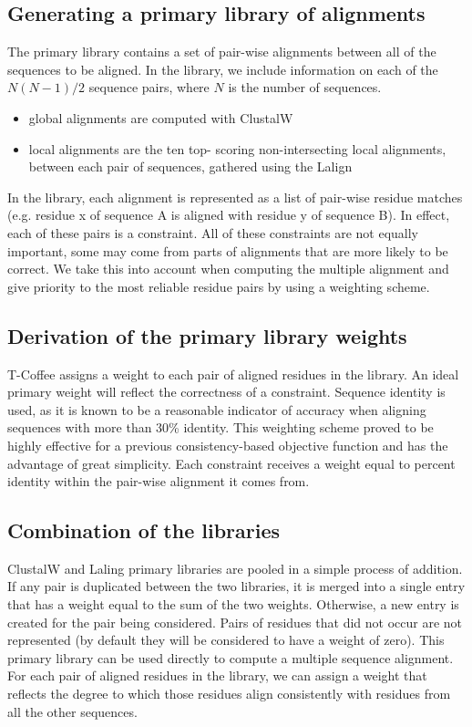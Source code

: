 \subsection{Generating a primary library of alignments}
The primary library contains a set of pair-wise alignments between all of the sequences to be aligned.
In the library, we include information on each of the $N(N - 1)/2$ sequence pairs, where $N$ is the number of sequences.
\begin{itemize}
\item global alignments are computed with ClustalW
\item  local alignments are the ten top- scoring non-intersecting local alignments, between each pair of sequences, gathered using the Lalign
\end{itemize}
In the library, each alignment is represented as a list of pair-wise residue matches (e.g. residue x of sequence A is aligned with residue y of sequence B). In effect, each of these pairs is a constraint. All of these constraints are not equally important, some may come from parts of alignments that are more likely to be correct. We take this into account when computing the multiple alignment and give priority to the most reliable residue pairs by using a weighting scheme.

\subsection{Derivation of the primary library weights}
T-Coffee assigns a weight to each pair of aligned residues in the library. An ideal primary weight will reflect the correctness of a constraint. Sequence identity is used, as it is known to be a reasonable indicator of accuracy when aligning sequences with more than 30\% identity. This weighting scheme proved to be highly effective for a previous consistency-based objective function and has the advantage of great simplicity.
Each constraint receives a weight equal to percent identity within the pair-wise alignment it comes from.

\subsection{Combination of the libraries}
ClustalW and Laling primary libraries are pooled in a simple process of addition.
If any pair is duplicated between the two libraries, it is merged into a single entry that has a weight equal to the sum of the two weights. Otherwise, a new entry is created for the pair being considered.
Pairs of residues that did not occur are not represented (by default they will be considered to have a weight of zero).
This primary library can be used directly to compute a multiple sequence alignment.
For each pair of aligned residues in the library, we can assign a weight that reflects the degree to which those residues align consistently with residues from all the other sequences.


